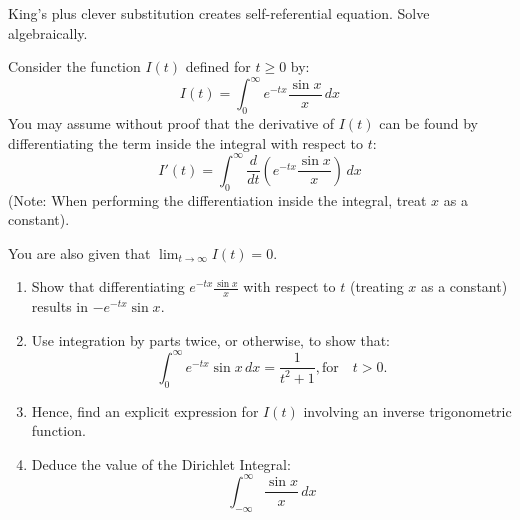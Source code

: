 \begin{takeaways}
King's plus clever substitution creates self-referential equation. Solve algebraically.
\end{takeaways}

\vspace{1cm}

\begin{problem}
   
Consider the function $I(t)$ defined for $t \ge 0$ by:
\[
I(t) = \int_{0}^{\infty} e^{-tx} \frac{\sin x}{x} \, dx
\]
You may assume without proof that the derivative of $I(t)$ can be found by differentiating the term inside the integral with respect to $t$:
\[
I'(t) = \int_{0}^{\infty} \frac{d}{dt} \left( e^{-tx} \frac{\sin x}{x} \right) \, dx
\]
(Note: When performing the differentiation inside the integral, treat $x$ as a constant).

You are also given that $\lim_{t \to \infty} I(t) = 0$.

\begin{enumerate}[label=(\roman*)]
    \item Show that differentiating $e^{-tx} \frac{\sin x}{x}$ with respect to $t$ (treating $x$ as a constant) results in $-e^{-tx} \sin x$. 
    
    \item Use integration by parts twice, or otherwise, to show that:
    \[
    \int_{0}^{\infty} e^{-tx} \sin x \, dx = \frac{1}{t^2 + 1},   \text{for} \quad t > 0. 
    \]
    
    \item Hence, find an explicit expression for $I(t)$ involving an inverse trigonometric function. 
    
    \item Deduce the value of the Dirichlet Integral:
    \[
    \int_{-\infty}^{\infty} \frac{\sin x}{x} \, dx
    \]
\end{enumerate}
    





\end{problem}


